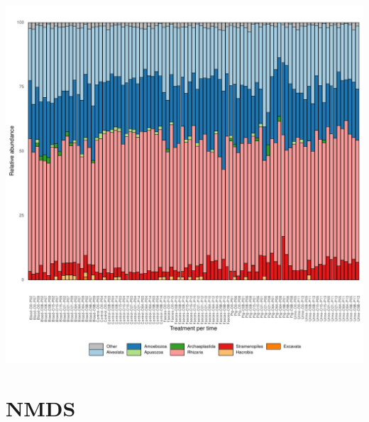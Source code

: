 \documentclass[11pt,english]{article}\usepackage[]{graphicx}\usepackage{xcolor}
\makeatletter
\def\maxwidth{ %
  \ifdim\Gin@nat@width>\linewidth
    \linewidth
  \else
    \Gin@nat@width
  \fi
}
\newenvironment{knitrout}{}{} %
\makeatother
\begin{document}
% 



\begin{knitrout}
\color{fgcolor}
\includegraphics[width=\maxwidth]{figure/image-taxo_profile-1} 

\end{knitrout}


\section{NMDS}
\end{document}
